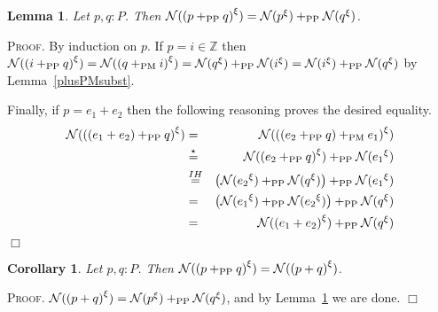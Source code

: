 \documentclass{article}
\newtheorem{lemma}[definition]{Lemma}
\newtheorem{corollary}[definition]{Corollary}
\newenvironment{proof}{\smallskip\textsc{Proof.}}{\hspace*{\fill}$\Box$}
\newcommand{\N}{{\cal N}}
\newcommand{\Z}{{\mathbb Z}}
\newcommand{\renamevar}[2]{\ensuremath{{#1}^{#2}}}
\newcommand{\plusPM}{\ensuremath{+_{\mathrm{PM}}}}
\newcommand{\plusPP}{\ensuremath{+_{\mathrm{PP}}}}
\begin{document}
\begin{lemma}\label{plusPPsubst} Let $p,q:P$.  Then
$\N(\renamevar{(p\plusPP q)}\xi)%
=\N(\renamevar p\xi)\plusPP\N(\renamevar q\xi)$.
\end{lemma}
\begin{proof}
By induction on $p$.  If $p=i\in\Z$ then
$\N(\renamevar{(i\plusPP q)}\xi)%
=\N(\renamevar{(q\plusPM i)}\xi)%
=\N(\renamevar q\xi)\plusPP\N(\renamevar i\xi)%
=\N(\renamevar i\xi)\plusPP\N(\renamevar q\xi)$
by Lemma~\ref{plusPMsubst}.

Finally, if $p=e_1+e_2$ then the following reasoning proves the desired
equality.
\begin{eqnarray*}
\N(\renamevar{((e_1+e_2)\plusPP q)}\xi)
 & = & \N(\renamevar{((e_2\plusPP q)\plusPM e_1)}\xi) \\
 & \stackrel\star= & \N(\renamevar{(e_2\plusPP q)}\xi)\plusPP%
   \N(\renamevar{e_1}\xi) \\
 & \stackrel{IH}= & \left(\N(\renamevar{e_2}\xi)\plusPP%
   \N(\renamevar q\xi)\right)\plusPP\N(\renamevar{e_1}\xi) \\
 & = & \left(\N(\renamevar{e_1}\xi)\plusPP\N(\renamevar{e_2}\xi)\right)%
   \plusPP\N(\renamevar q\xi) \\
 & = & \N(\renamevar{(e_1+e_2)}\xi)\plusPP\N(\renamevar q\xi) \\
\end{eqnarray*}
\end{proof}

\begin{corollary}\label{plusPPsubstvars} Let $p,q:P$.  Then
$\N(\renamevar{(p\plusPP q)}\xi)=\N(\renamevar{(p+q)}\xi)$.
\end{corollary}
\begin{proof}
$\N(\renamevar{(p+q)}\xi)=\N(\renamevar p\xi)\plusPP\N(\renamevar q\xi)$,
and by Lemma~\ref{plusPPsubst} we are done.
\end{proof}
\end{document}
